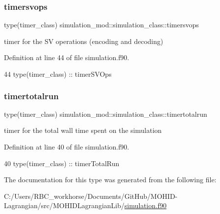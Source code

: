 \subsubsection{\texorpdfstring{timersvops}{timersvops}}
{\footnotesize\ttfamily type(timer\+\_\+class) simulation\+\_\+mod\+::simulation\+\_\+class\+::timersvops\hspace{0.3cm}{\ttfamily [private]}}



timer for the SV operations (encoding and decoding) 



Definition at line 44 of file simulation.\+f90.


\begin{DoxyCode}
44         \textcolor{keywordtype}{type}(timer\_class) :: timerSVOps
\end{DoxyCode}
\mbox{\label{structsimulation__mod_1_1simulation__class_aff028c1a3b421c73038e43b860f45de1}} 
\subsubsection{\texorpdfstring{timertotalrun}{timertotalrun}}
{\footnotesize\ttfamily type(timer\+\_\+class) simulation\+\_\+mod\+::simulation\+\_\+class\+::timertotalrun\hspace{0.3cm}{\ttfamily [private]}}



timer for the total wall time spent on the simulation 



Definition at line 40 of file simulation.\+f90.


\begin{DoxyCode}
40         \textcolor{keywordtype}{type}(timer\_class) :: timerTotalRun
\end{DoxyCode}


The documentation for this type was generated from the following file\+:\begin{DoxyCompactItemize}
\item 
C\+:/\+Users/\+R\+B\+C\+\_\+workhorse/\+Documents/\+Git\+Hub/\+M\+O\+H\+I\+D-\/\+Lagrangian/src/\+M\+O\+H\+I\+D\+Lagrangian\+Lib/\mbox{\hyperlink{simulation_8f90}{simulation.\+f90}}\end{DoxyCompactItemize}
